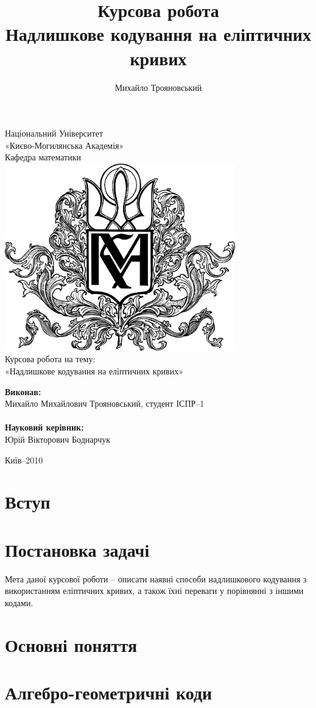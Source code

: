 \documentclass[a4paper,12pt,oneside]{article}
\title{Курсова робота\\Надлишкове кодування на еліптичних кривих}
\author{Михайло Трояновський}
\begin{document}
\begin{titlepage}
\begin{center}
Національний Університет\\ «Києво-Могилянська Академія»\\
        Кафедра математики\\
        \vskip 3cm
        \includegraphics[width=100mm]{kma}\\
                               \vskip 1cm
{\Large
    Курсова робота на тему:\\
        «Надлишкове кодування на еліптичних кривих»
}
\vskip 1cm
\textwidth
\begin{minipage}{0.5\textwidth}
\textbf{Виконав:}\\
        Михайло Михайлович Трояновський, студент ІСПР–1\\
        \\
        \textbf{Науковий керівник:}\\
        Юрій Вікторович Боднарчук
        \end{minipage}
        \vfill
        Київ–2010
        \end{center}
        \end{titlepage}


\tableofcontents
\pagebreak

\section{Вступ}


\section{Постановка задачі}
Мета даної курсової роботи -- описати наявні способи надлишкового кодування з використанням еліптичних кривих, а також їхні переваги у порівнянні з іншими кодами.

\section{Основні поняття}

\section{Алгебро-геометричні коди}

\nocite{*}

\clearpage
{}

\end{document}

